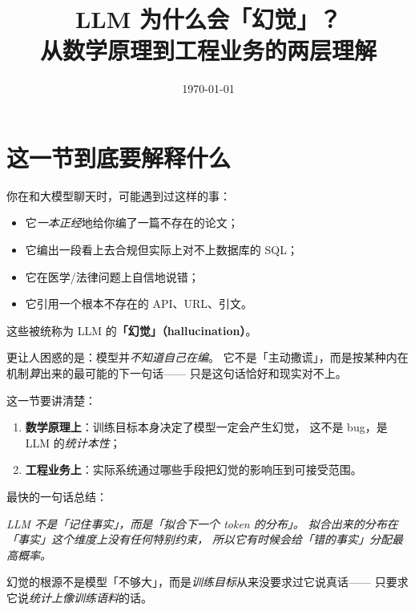 \documentclass[11pt,a4paper]{ctexart}
\title{LLM 为什么会「幻觉」？\\\large 从数学原理到工程业务的两层理解}
\author{}
\date{\today}
\begin{document}
\maketitle
\tableofcontents
\newpage

\section{这一节到底要解释什么}

\begin{problemblock}
你在和大模型聊天时，可能遇到过这样的事：
\begin{itemize}
  \item 它\emph{一本正经}地给你编了一篇不存在的论文；
  \item 它编出一段看上去合规但实际上对不上数据库的 SQL；
  \item 它在医学/法律问题上自信地说错；
  \item 它引用一个根本不存在的 API、URL、引文。
\end{itemize}
这些被统称为 LLM 的\textbf{「幻觉」（hallucination）}。

更让人困惑的是：模型并\emph{不知道自己在编}。
它不是「主动撒谎」，而是按某种内在机制\emph{算}出来的最可能的下一句话——
只是这句话恰好和现实对不上。

这一节要讲清楚：
\begin{enumerate}
  \item \textbf{数学原理上}：训练目标本身决定了模型一定会产生幻觉，
        这不是 bug，是 LLM 的\emph{统计本性}；
  \item \textbf{工程业务上}：实际系统通过哪些手段把幻觉的影响压到可接受范围。
\end{enumerate}
\end{problemblock}

\begin{intuitionblock}
最快的一句话总结：

\begin{center}
\textit{LLM 不是「记住事实」，而是「拟合下一个 token 的分布」。
拟合出来的分布在「事实」这个维度上没有任何特别约束，
所以它\emph{有时候}会给「错的事实」分配最高概率。}
\end{center}
\end{intuitionblock}

\begin{keypointblock}
幻觉的根源不是模型「不够大」，而是\emph{训练目标}从来没要求过它说真话——
只要求它说\emph{统计上像训练语料}的话。
\end{keypointblock}
\end{document}
